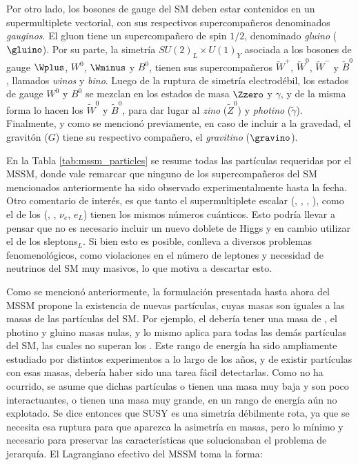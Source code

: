 Por otro lado, los bosones de gauge del SM deben estar contenidos en un supermultiplete vectorial, con sus respectivos supercompañeros denominados \textit{gauginos}. El gluon tiene un supercompañero de spin $1/2$, denominado \textit{gluino} ($\gluino$). Por su parte, la simetría $SU(2)_L\times U(1)_Y$ asociada a los bosones de gauge $\Wplus$, $W^0$, $\Wminus$ y $B^0$, tienen sus supercompañeros $\widetilde{W}^+$, $\widetilde{W}^0$, $\widetilde{W}^-$ y $\tilde{B}^0$, llamados \textit{winos} y \textit{bino}. Luego de la ruptura de simetría electrodébil, los estados de gauge $W^0$ y $B^0$ se mezclan en los estados de masa $\Zzero$ y $\gamma$, y de la misma forma lo hacen los $\widetilde{W}^0$ y $\widetilde{B}^0$, para dar lugar al \textit{zino} ($\widetilde{Z}^0$) y \textit{photino} ($\tilde{\gamma}$). Finalmente, y como se mencionó previamente, en caso de incluir a la gravedad, el gravitón ($G$) tiene su respectivo compañero, el \textit{gravitino} ($\gravino$).

En la Tabla \ref{tab:mssm_particles} se resume todas las partículas requeridas por el MSSM, donde vale remarcar que ninguno de los supercompañeros del SM mencionados anteriormente ha sido observado experimentalmente hasta la fecha. Otro comentario de interés, es que tanto el supermultiplete escalar \Hd (\Hdzero, \Hdm, \Hinodzero, \Hinodm), como el de los \sleptonL (\snu, \selL, $\nu_e$, $e_L$) tienen los mismos números cuánticos. Esto podría llevar a pensar que no es necesario incluir un nuevo doblete de Higgs y en cambio utilizar el de los sleptons$_L$. Si bien esto es posible, conlleva a diversos problemas fenomenológicos, como violaciones en el número de leptones y necesidad de neutrinos del SM muy masivos, lo que motiva a descartar esto.



Como se mencionó anteriormente, la formulación presentada hasta ahora del MSSM propone la existencia de nuevas partículas, cuyas masas son iguales a las masas de las partículas del SM. Por ejemplo, el \selL debería tener una masa de , el photino y gluino masas nulas, y lo mismo aplica para todas las demás partículas del SM, las cuales no superan los . Este rango de energía ha sido ampliamente estudiado por distintos experimentos a lo largo de los años, y de existir partículas con esas masas, debería haber sido una tarea fácil detectarlas. Como no ha ocurrido, se asume que dichas partículas o tienen una masa muy baja y son poco interactuantes, o tienen una masa muy grande, en un rango de energía aún no explotado. Se dice entonces que SUSY es una simetría débilmente rota, ya que se necesita esa ruptura para que aparezca la asimetría en masas, pero lo mínimo y necesario para preservar las características que solucionaban el problema de jerarquía. El Lagrangiano efectivo del MSSM toma la forma:




